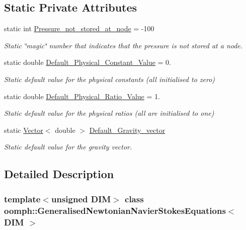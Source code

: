 \subsection*{Static Private Attributes}
\begin{DoxyCompactItemize}
\item 
static int \hyperlink{classoomph_1_1GeneralisedNewtonianNavierStokesEquations_aa00dd91ac0f799d0f2798248db7e55d8}{Pressure\+\_\+not\+\_\+stored\+\_\+at\+\_\+node} = -\/100
\begin{DoxyCompactList}\small\item\em Static \char`\"{}magic\char`\"{} number that indicates that the pressure is not stored at a node. \end{DoxyCompactList}\item 
static double \hyperlink{classoomph_1_1GeneralisedNewtonianNavierStokesEquations_a09217b3193c9ee04ced565a1307ddb4e}{Default\+\_\+\+Physical\+\_\+\+Constant\+\_\+\+Value} = 0.
\begin{DoxyCompactList}\small\item\em Static default value for the physical constants (all initialised to zero) \end{DoxyCompactList}\item 
static double \hyperlink{classoomph_1_1GeneralisedNewtonianNavierStokesEquations_a48efa8ee449c2595b65bf42fa7ecde23}{Default\+\_\+\+Physical\+\_\+\+Ratio\+\_\+\+Value} = 1.
\begin{DoxyCompactList}\small\item\em Static default value for the physical ratios (all are initialised to one) \end{DoxyCompactList}\item 
static \hyperlink{classoomph_1_1Vector}{Vector}$<$ double $>$ \hyperlink{classoomph_1_1GeneralisedNewtonianNavierStokesEquations_a2166822a95d7030623a8c026d95c947f}{Default\+\_\+\+Gravity\+\_\+vector}
\begin{DoxyCompactList}\small\item\em Static default value for the gravity vector. \end{DoxyCompactList}\end{DoxyCompactItemize}


\subsection{Detailed Description}
\subsubsection*{template$<$unsigned D\+IM$>$\newline
class oomph\+::\+Generalised\+Newtonian\+Navier\+Stokes\+Equations$<$ D\+I\+M $>$}

